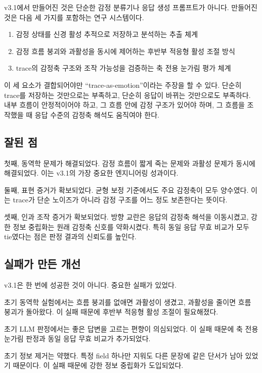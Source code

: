 \documentclass[11pt,a4paper]{article}
\begin{document}
v3.1에서 만들어진 것은 단순한 감정 분류기나 응답 생성 프롬프트가 아니다. 만들어진 것은 다음 세 가지를 포함하는 연구 시스템이다.

\begin{enumerate}
  \item 감정 상태를 신경 활성 추적으로 저장하고 분석하는 추출 체계
  \item 감정 흐름 붕괴와 과활성을 동시에 제어하는 후반부 적응형 활성 조절 방식
  \item trace의 감정축 구조와 조작 가능성을 검증하는 축 전용 눈가림 평가 체계
\end{enumerate}

이 세 요소가 결합되어야만 ``trace-as-emotion''이라는 주장을 할 수 있다. 단순히 trace를 저장하는 것만으로는 부족하고, 단순히 응답이 바뀌는 것만으로도 부족하다. 내부 흐름이 안정적이어야 하고, 그 흐름 안에 감정 구조가 있어야 하며, 그 흐름을 조작했을 때 응답 수준의 감정축 해석도 움직여야 한다.

\subsection{잘된 점}

첫째, 동역학 문제가 해결되었다. 감정 흐름이 짧게 죽는 문제와 과활성 문제가 동시에 해결되었다. 이는 v3.1의 가장 중요한 엔지니어링 성과이다.

둘째, 표현 증거가 확보되었다. 균형 보정 기준에서도 주요 감정축이 모두 양수였다. 이는 trace가 단순 노이즈가 아니라 감정 구조를 어느 정도 보존한다는 뜻이다.

셋째, 인과 조작 증거가 확보되었다. 방향 교란은 응답의 감정축 해석을 이동시켰고, 강한 정보 중립화는 원래 감정축 신호를 약화시켰다. 특히 동일 응답 무효 비교가 모두 tie였다는 점은 판정 결과의 신뢰도를 높인다.

\subsection{실패가 만든 개선}

v3.1은 한 번에 성공한 것이 아니다. 중요한 실패가 있었다.

초기 동역학 실험에서는 흐름 붕괴를 없애면 과활성이 생겼고, 과활성을 줄이면 흐름 붕괴가 돌아왔다. 이 실패 때문에 후반부 적응형 활성 조절이 필요해졌다.

초기 LLM 판정에서는 좋은 답변을 고르는 편향이 의심되었다. 이 실패 때문에 축 전용 눈가림 판정과 동일 응답 무효 비교가 추가되었다.

초기 정보 제거는 약했다. 특정 field 하나만 지워도 다른 문장에 같은 단서가 남아 있었기 때문이다. 이 실패 때문에 강한 정보 중립화가 도입되었다.
\end{document}
